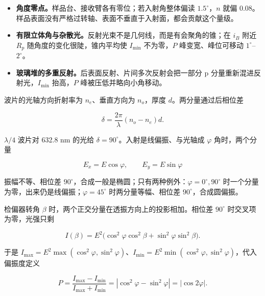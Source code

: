 \documentclass[11pt]{ctexart}
\begin{document}
\begin{itemize}
\item \textbf{角度零点。}样品台、接收臂各有零位；若入射角整体偏读 $1.5^\circ$，$n$ 就偏 $0.08$。样品表面没有严格过转轴、表面不垂直于入射面，都会贡献这个量级。
\item \textbf{有限立体角与杂散光。}反射光束不是几何线，而是有会聚角的锥；在 $i_B$ 附近 $R_p$ 随角度的变化很陡，锥内平均使 $I_{\min}$ 不为零，$P$ 峰变宽、峰位可移动 $1^\circ$--$2^\circ$。
\item \textbf{玻璃堆的多重反射。}后表面反射、片间多次反射会把一部分 p 分量重新混进反射光，$I_{\min}$ 抬高，$P$ 峰被压低并略向小角移动。
\end{itemize}




波片的光轴方向折射率为 $n_e$、垂直方向为 $n_o$，厚度 $d$。两分量通过后相位差

\[
\delta=\frac{2\pi}{\lambda}(n_o-n_e)d .
\]

$\lambda/4$ 波片对 632.8 nm 的光给 $\delta=90^\circ$。入射是线偏振、与光轴成 $\varphi$ 角时，两个分量

\[
E_x=E\cos\varphi,\qquad E_y=E\sin\varphi
\]

振幅不等、相位差 $90^\circ$，合成一般是椭圆；只有两种例外：$\varphi=0^\circ,90^\circ$ 时一个分量为零，出来仍是线偏振；$\varphi=45^\circ$ 时两分量等幅、相位差 $90^\circ$，合成圆偏振。


检偏器转角 $\beta$ 时，两个正交分量在透振方向上的投影相加。相位差 $90^\circ$ 时交叉项为零，光强只剩

\[
I(\beta)=E^2\bigl(\cos^2\varphi\cos^2\beta+\sin^2\varphi\sin^2\beta\bigr).
\]

于是 $I_{\max}=E^2\max(\cos^2\varphi,\sin^2\varphi)$、$I_{\min}=E^2\min(\cos^2\varphi,\sin^2\varphi)$，代入偏振度定义

\[
P=\frac{I_{\max}-I_{\min}}{I_{\max}+I_{\min}}
=|\cos^2\varphi-\sin^2\varphi|=|\cos2\varphi| .
\]
\end{document}

